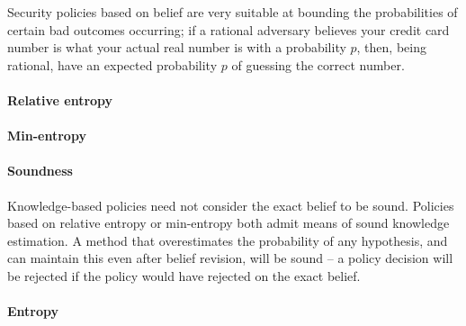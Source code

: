 
Security policies based on belief are very suitable at bounding the
probabilities of certain bad outcomes occurring; if a rational
adversary believes your credit card number is what your actual real
number is with a probability $ p $, then, being rational, have an
expected probability $ p $ of guessing the correct number.


\paragraph{Relative entropy}

\paragraph{Min-entropy}

\paragraph{Soundness}

Knowledge-based policies need not consider the exact belief to be
sound. Policies based on relative entropy or min-entropy both admit
means of sound knowledge estimation. A method that overestimates the
probability of any hypothesis, and can maintain this even after belief
revision, will be sound -- a policy decision will be rejected if the
policy would have rejected on the exact belief.


\paragraph{Entropy}
